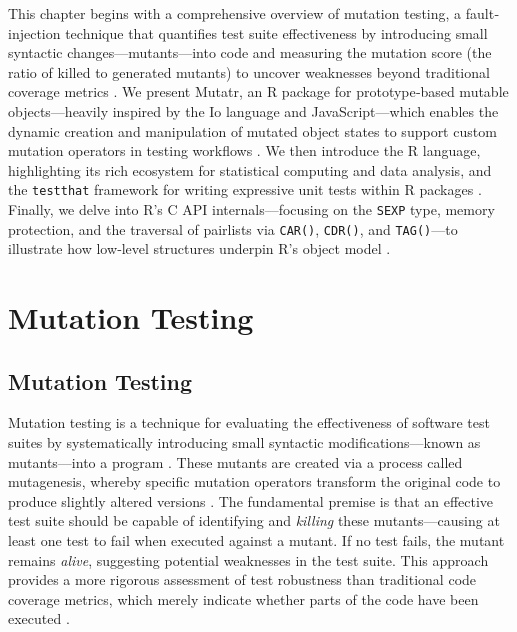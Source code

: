 
\begin{chapterabstract}
This chapter begins with a comprehensive overview of mutation testing, a fault‐injection technique that quantifies test suite effectiveness by introducing small syntactic changes—mutants—into code and measuring the mutation score (the ratio of killed to generated mutants) to uncover weaknesses beyond traditional coverage metrics \cite{jia2011analysis,offutt1996practical,petrovic2018industrial}. We present Mutatr, an R package for prototype‐based mutable objects—heavily inspired by the Io language and JavaScript—which enables the dynamic creation and manipulation of mutated object states to support custom mutation operators in testing workflows \cite{hadley-mutatr,iolanguage}. We then introduce the R language, highlighting its rich ecosystem for statistical computing and data analysis, and the \texttt{testthat} framework for writing expressive unit tests within R packages \cite{rcore2024,wickham2011testthat}. Finally, we delve into R’s C API internals—focusing on the \texttt{SEXP} type, memory protection, and the traversal of pairlists via \texttt{CAR()}, \texttt{CDR()}, and \texttt{TAG()}—to illustrate how low‐level structures underpin R’s object model \cite{hadley-r-internals-pairlists}.  

\end{chapterabstract}

\section{Mutation Testing}

\subsection{Mutation Testing}

Mutation testing is a technique for evaluating the effectiveness of software test suites by systematically introducing small syntactic modifications—known as mutants—into a program \cite{jia2011analysis}. These mutants are created via a process called mutagenesis, whereby specific mutation operators transform the original code to produce slightly altered versions \cite{offutt1996practical}. The fundamental premise is that an effective test suite should be capable of identifying and \textit{killing} these mutants—causing at least one test to fail when executed against a mutant. If no test fails, the mutant remains \textit{alive}, suggesting potential weaknesses in the test suite. This approach provides a more rigorous assessment of test robustness than traditional code coverage metrics, which merely indicate whether parts of the code have been executed \cite{petrovic2018industrial}.

